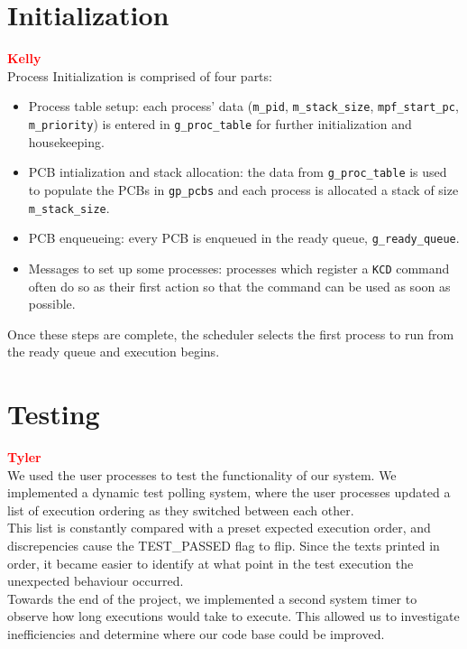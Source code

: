 \documentclass[12pt]{report}
\begin{document}
\section{Initialization}

\textcolor{red}{\textbf{Kelly}} \\

Process Initialization is comprised of four parts:
\begin{itemize}
	\item Process table setup: each process' data (\texttt{m_pid}, \texttt{m_stack_size},
		\texttt{mpf_start_pc}, \texttt{m_priority}) is entered in \texttt{g_proc_table}
		for further initialization and housekeeping.
	\item PCB intialization and stack allocation: the data from \texttt{g_proc_table}
		is used to populate the PCBs in \texttt{gp_pcbs} and each process is
		allocated a stack of size \texttt{m_stack_size}.
	\item PCB enqueueing: every PCB is enqueued in the ready queue, \texttt{g_ready_queue}.
	\item Messages to set up some processes: processes which register a \texttt{KCD}
		command often do so as their first action so that the command can be
		used as soon as possible.
\end{itemize}
Once these steps are complete, the scheduler selects the first process to run
from the ready queue and execution begins.


\section{Testing}

\textcolor{red}{\textbf{Tyler}} \\
We used the user processes to test the functionality of our system. We implemented a dynamic test polling system, where the user processes updated a list of execution ordering as they switched between each other.\\
This list is constantly compared with a preset expected execution order, and discrepencies cause the TEST_PASSED flag to flip. Since the texts printed in order, it became easier to identify at what point in the test execution the unexpected behaviour occurred.\\

Towards the end of the project, we implemented a second system timer to observe how long executions would take to execute. This allowed us to investigate inefficiencies and determine where our code base could be improved.\\
\end{document}
